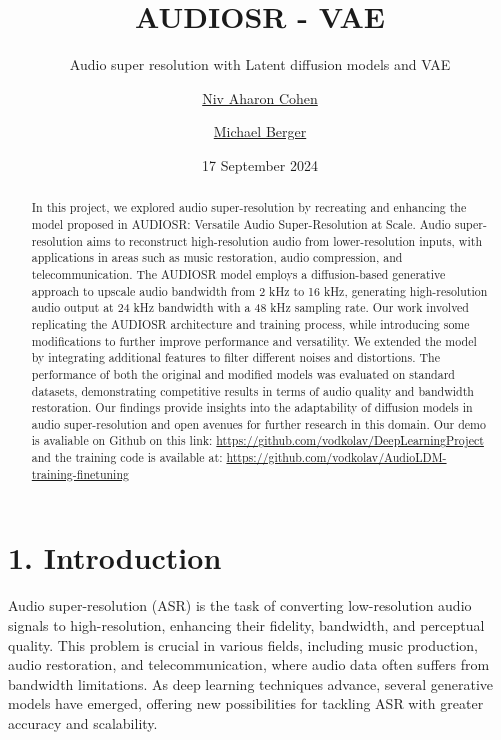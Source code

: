 \documentclass[
  ]{scrartcl}
\title{AUDIOSR - VAE}
\subtitle{Audio super resolution with Latent diffusion models and VAE}
\author{\href{mailto:nivcohen1000@gmail.com}{Niv Aharon
Cohen} \and \href{mailto:michael.berger.e@gmail.com}{Michael Berger}}
\date{17 September 2024}
\begin{document}
\maketitle
\begin{abstract}
In this project, we explored audio super-resolution by recreating and
enhancing the model proposed in AUDIOSR: Versatile Audio
Super-Resolution at Scale. Audio super-resolution aims to reconstruct
high-resolution audio from lower-resolution inputs, with applications in
areas such as music restoration, audio compression, and
telecommunication. The AUDIOSR model employs a diffusion-based
generative approach to upscale audio bandwidth from 2 kHz to 16 kHz,
generating high-resolution audio output at 24 kHz bandwidth with a 48
kHz sampling rate. Our work involved replicating the AUDIOSR
architecture and training process, while introducing some modifications
to further improve performance and versatility. We extended the model by
integrating additional features to filter different noises and
distortions. The performance of both the original and modified models
was evaluated on standard datasets, demonstrating competitive results in
terms of audio quality and bandwidth restoration. Our findings provide
insights into the adaptability of diffusion models in audio
super-resolution and open avenues for further research in this domain.
Our demo is avaliable on Github on this link:
\url{https://github.com/vodkolav/DeepLearningProject} and the training
code is available at:
\href{https://github.com/vodkolav/AudioLDM-training-finetuning/tree/SR_training}{https://github.com/vodkolav/AudioLDM-training-finetuning}
\end{abstract}



\renewcommand*\contentsname{Contents}
{
\setcounter{tocdepth}{1}
\tableofcontents
}
\section{1. Introduction}\label{introduction}

Audio super-resolution (ASR) is the task of converting low-resolution
audio signals to high-resolution, enhancing their fidelity, bandwidth,
and perceptual quality. This problem is crucial in various fields,
including music production, audio restoration, and telecommunication,
where audio data often suffers from bandwidth limitations. As deep
learning techniques advance, several generative models have emerged,
offering new possibilities for tackling ASR with greater accuracy and
scalability.
\end{document}
